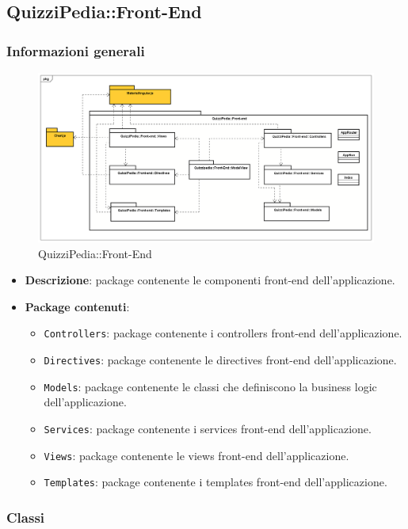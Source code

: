 \subsection{QuizziPedia::Front-End}
\subsubsection{Informazioni generali}
\label{QuizziPedia::Front-End}
\begin{figure}[ht]
	\centering
	\includegraphics[scale=0.45]{UML/Package/QuizziPedia_Front-end.png}
	\caption{QuizziPedia::Front-End}
\end{figure}
\FloatBarrier
	\begin{itemize}
		\item \textbf{Descrizione}: package contenente le componenti front-end dell'applicazione.
		\item \textbf{Package contenuti}:
		\begin{itemize}
			\item \texttt{Controllers}: package contenente i controllers front-end dell'applicazione.
			\item \texttt{Directives}: package contenente le directives front-end dell'applicazione.
			\item \texttt{Models}: package contenente le classi che definiscono la business logic dell'applicazione.
			\item \texttt{Services}: package contenente i services front-end dell'applicazione.
			\item \texttt{Views}: package contenente le views front-end dell'applicazione.
			\item \texttt{Templates}: package contenente i templates front-end dell'applicazione.
		\end{itemize}
	\end{itemize}

\subsubsection{Classi}
